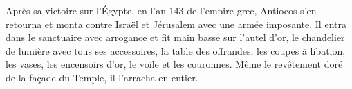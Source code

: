 Après sa victoire sur l’Égypte, en l’an 143 de l’empire grec,
	Antiocos s’en retourna et monta contre Israël et Jérusalem avec une armée imposante.
Il entra dans le sanctuaire avec arrogance et fit main basse sur l’autel d’or,
	le chandelier de lumière avec tous ses accessoires,
	la table des offrandes, les coupes à libation,
	les vases, les encensoirs d’or, le voile et les couronnes.
Même le revêtement doré de la façade du Temple, il l’arracha en entier.
